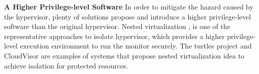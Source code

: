 ﻿\documentclass[conference]{IEEEtran}
\begin{document}
\textbf{A Higher Privilege-level Software }
In order to mitigate the hazard caused by the hypervisor, plenty of solutions propose and introduce a higher privilege-level software than the original hypervisor.
Nested virtualization  \cite{Ben2007The}, \cite{Zhang2011CloudVisor} is one of the representative approaches to isolate hypervisor, which provides a higher privilege-level execution environment to run the monitor securely. 
The turtles project \cite{Ben2007The} and CloudVisor \cite{Zhang2011CloudVisor} are examples of systems that propose nested virtualization idea to achieve isolation for protected resources. 

%

\end{document}
